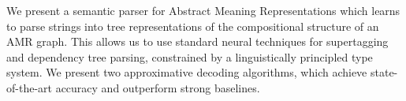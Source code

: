 We present a semantic parser for Abstract Meaning Representations which learns to parse strings into tree representations of the compositional structure of an AMR graph. This allows us to use standard neural techniques for supertagging and dependency tree parsing, constrained by a linguistically principled type system. We present two approximative decoding algorithms, which achieve state-of-the-art accuracy and outperform strong baselines.
